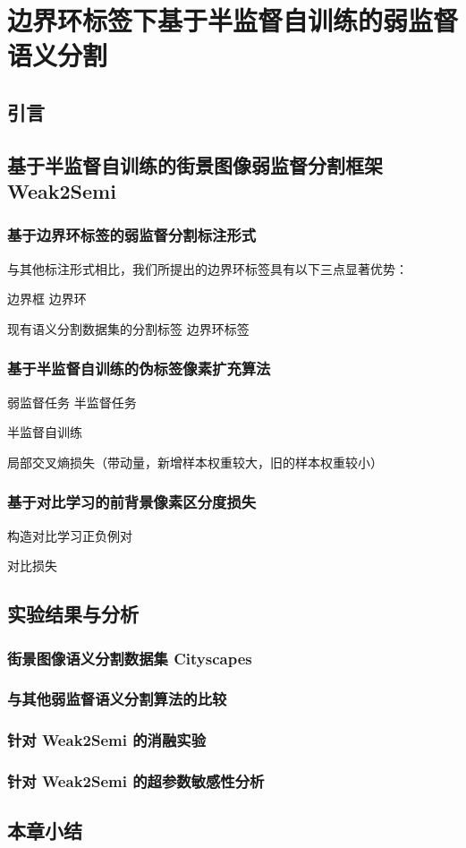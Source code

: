 \chapter{边界环标签下基于半监督自训练的弱监督语义分割}
\section{引言}
\section{基于半监督自训练的街景图像弱监督分割框架 Weak2Semi}
\subsection{基于边界环标签的弱监督分割标注形式}
与其他标注形式相比，我们所提出的边界环标签具有以下三点显著优势：

边界框 \rightarrow 边界环
\par
现有语义分割数据集的分割标签 \rightarrow 边界环标签
\subsection{基于半监督自训练的伪标签像素扩充算法}
弱监督任务 \rightarrow 半监督任务
\par
半监督自训练
\par
局部交叉熵损失（带动量，新增样本权重较大，旧的样本权重较小）
\subsection{基于对比学习的前背景像素区分度损失}
构造对比学习正负例对
\par
对比损失
\section{实验结果与分析}
\subsection{街景图像语义分割数据集 Cityscapes}
\subsection{与其他弱监督语义分割算法的比较}
\subsection{针对 Weak2Semi 的消融实验}
\subsection{针对 Weak2Semi 的超参数敏感性分析}
\section{本章小结}
